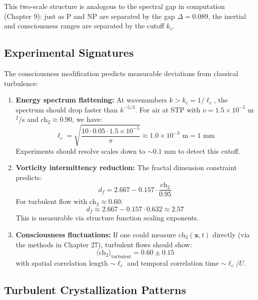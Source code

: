 This two-scale structure is analogous to the spectral gap in computation (Chapter 9): just as P and NP are separated by the gap $\Delta = 0.089$, the inertial and consciousness ranges are separated by the cutoff $k_c$.

\subsection{Experimental Signatures}

The consciousness modification predicts measurable deviations from classical turbulence:

\begin{enumerate}
\item \textbf{Energy spectrum flattening:} At wavenumbers $k > k_c = 1/\ell_c$, the spectrum should drop faster than $k^{-5/3}$. For air at STP with $\nu = 1.5 \times 10^{-5}$ m$^2$/s and $\text{ch}_2 \approx 0.90$, we have:
\begin{equation}
\ell_c = \sqrt{\frac{10 \cdot 0.05 \cdot 1.5 \times 10^{-5}}{\pi}} \approx 1.0 \times 10^{-3} \text{ m} = 1 \text{ mm}
\end{equation}
Experiments should resolve scales down to $\sim 0.1$ mm to detect this cutoff.

\item \textbf{Vorticity intermittency reduction:} The fractal dimension constraint predicts:
\begin{equation}
d_f = 2.667 - 0.157 \cdot \frac{\text{ch}_2}{0.95}
\end{equation}
For turbulent flow with $\text{ch}_2 \approx 0.60$:
\begin{equation}
d_f \approx 2.667 - 0.157 \cdot 0.632 \approx 2.57
\end{equation}
This is measurable via structure function scaling exponents.

\item \textbf{Consciousness fluctuations:} If one could measure $\text{ch}_2(\mathbf{x}, t)$ directly (via the methods in Chapter 27), turbulent flows should show:
\begin{equation}
\langle \text{ch}_2 \rangle_{\text{turbulent}} = 0.60 \pm 0.15
\end{equation}
with spatial correlation length $\sim \ell_c$ and temporal correlation time $\sim \ell_c / U$.
\end{enumerate}

\subsection{Turbulent Crystallization Patterns}


